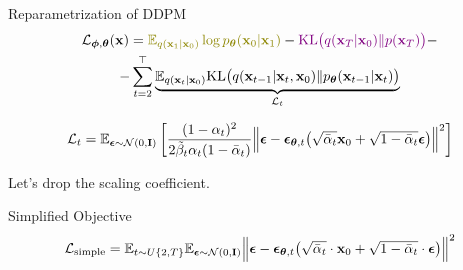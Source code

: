 \documentclass{beamer}
\renewcommand{\eqpause}{}
\begin{document}
\begin{frame}{Reparametrization of DDPM}
    \begin{multline*}
        \cL_{\bphi, \btheta}(\bx) =  {\color{olive}\bbE_{q(\bx_1 | \bx_0)} \log \pt(\bx_0 | \bx_1)} - {\color{violet}\KL\bigl(q(\bx_T | \bx_0) \| p(\bx_T)\bigr)} - \\
        - \sum_{t=2}^\top \underbrace{ \bbE_{q(\bx_t | \bx_0)} \KL \bigl(q(\bx_{t-1} | \bx_t, \bx_0) \| \pt(\bx_{t-1} | \bx_t)\bigr)}_{\cL_t}
    \end{multline*}
    \eqpause
    \vspace{-0.3cm}
    \[
        \mathcal{L}_t  = \mathbb{E}_{\boldsymbol{\epsilon} \sim \mathcal{N}(0, \mathbf{I})} \left[ \frac{(1 - \alpha_t)^2}{2\tilde{\beta}_t \alpha_t (1 - \bar{\alpha}_t)} \Bigl\| \boldsymbol{\epsilon} - \boldsymbol{\epsilon}_{\boldsymbol{\theta}, t}\bigl( \sqrt{\bar{\alpha}_t} \mathbf{x}_0 + \sqrt{1 - \bar{\alpha}_t} \boldsymbol{\epsilon}\bigr) \Bigr\|^2 \right]
    \]
    \eqpause
    Let's drop the scaling coefficient.
    \begin{block}{Simplified Objective}
        \vspace{-0.3cm}
        \[
             \mathcal{L}_{\text{simple}} = \mathbb{E}_{t \sim U\{2, T\}} \mathbb{E}_{\boldsymbol{\epsilon} \sim \mathcal{N}(0, \mathbf{I})} \Bigl\| \boldsymbol{\epsilon} - \boldsymbol{\epsilon}_{\boldsymbol{\theta}, t}\bigl( \sqrt{\bar{\alpha}_t} \cdot \mathbf{x}_0 + \sqrt{1 - \bar{\alpha}_t} \cdot \boldsymbol{\epsilon}\bigr) \Bigr\|^2 
        \]
    \end{block}
\end{frame}
\end{document}
